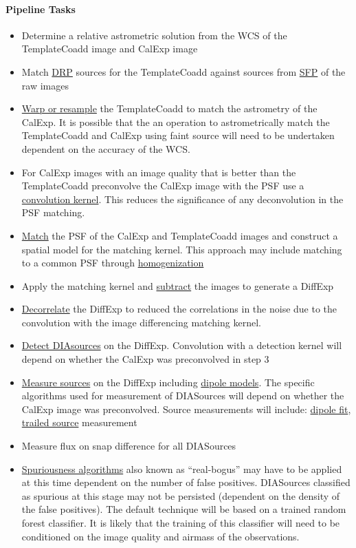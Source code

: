 \paragraph{Pipeline Tasks}
\begin{itemize}
\item Determine a relative astrometric solution from the WCS of the TemplateCoadd image and CalExp image
\item Match \hyperref[sec:apSourcemeasurement]{DRP} sources for the TemplateCoadd against sources from \hyperref[sec:apSingleFrameProcessing]{SFP} of the raw images 
\item \hyperref[sec:acWarping]{Warp or resample} the TemplateCoadd to match the astrometry of the CalExp. It is possible that the an operation to astrometrically match the TemplateCoadd and CalExp using faint source will need to be undertaken dependent on the accuracy of the WCS.
\item For CalExp images with an image quality that is better than the TemplateCoadd preconvolve the CalExp image with the PSF use a  \hyperref[sec:spKernels]{convolution kernel}. This reduces the significance of any deconvolution in the PSF matching.
\item \hyperref[sec:acDiffImDecorrelation]{Match} the PSF of the CalExp and TemplateCoadd images and construct a spatial model for the matching kernel. This approach may include matching to a common PSF through \hyperref[sec:acPSFHomogenization]{homogenization} 
\item Apply the matching kernel and \hyperref[sec:acImageSubtraction]{subtract} the images to generate a DiffExp
\item \hyperref[sec:acDiffImDecorrelation]{Decorrelate} the DiffExp to reduced the correlations in the noise due to the convolution with the image differencing matching kernel. 
\item \hyperref[sec:acSourceDetection]{Detect DIAsources} on the DiffExp. Convolution with a detection kernel will depend on whether the CalExp was preconvolved in step 3
\item \hyperref[sec:acDiffImMeasurement]{ Measure sources} on the DiffExp including \hyperref[sec:acDipoleModels]{dipole models}. The specific algorithms used for measurement of DIASources will depend on whether the CalExp image was preconvolved.  Source measurements will include: \hyperref[sec:acDipoleModels]{dipole fit}, \hyperref[sec:acTrailedPointSourceModels]{trailed source} measurement
\item Measure flux on snap difference for all DIASources
\item \hyperref[sec:acSpuriousnessAlgorithms]{Spuriousness algorithms} also known as ``real-bogus'' may have to be applied at this time dependent on the number of false positives. DIASources classified as spurious at this stage may not be persisted (dependent on the density of the false positives). The default technique will be based on a trained random forest classifier. It is likely that the training of this classifier will need to be conditioned on the image quality and airmass of the observations.
\end{itemize}

